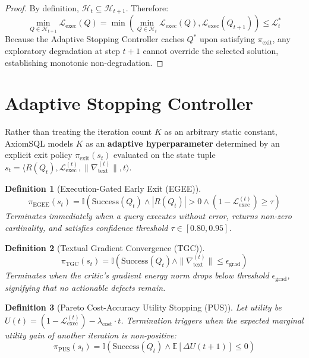 \documentclass[conference]{IEEEtran}
\newtheorem{definition}{Definition}
\begin{document}
\begin{proof}
By definition, $\mathcal{H}_{t} \subseteq \mathcal{H}_{t+1}$. Therefore:
\begin{equation}
    \min_{Q \in \mathcal{H}_{t+1}} \mathcal{L}_{\text{exec}}(Q) = \min\left( \min_{Q \in \mathcal{H}_t} \mathcal{L}_{\text{exec}}(Q), \mathcal{L}_{\text{exec}}(Q_{t+1}) \right) \le \mathcal{L}^*_t
\end{equation}
Because the Adaptive Stopping Controller caches $Q^*$ upon satisfying $\pi_{\text{exit}}$, any exploratory degradation at step $t+1$ cannot override the selected solution, establishing monotonic non-degradation.
\end{proof}

\section{Adaptive Stopping Controller}

Rather than treating the iteration count $K$ as an arbitrary static constant, AxiomSQL models $K$ as an \textbf{adaptive hyperparameter} determined by an explicit exit policy $\pi_{\text{exit}}(s_t)$ evaluated on the state tuple $s_t = \langle R(Q_t), \mathcal{L}_{\text{exec}}^{(t)}, \|\nabla_{\text{text}}^{(t)}\|, t \rangle$.

\begin{definition}[Execution-Gated Early Exit (EGEE)]
\begin{equation}
    \pi_{\text{EGEE}}(s_t) = \mathbb{I}\left( \text{Success}(Q_t) \land |R(Q_t)| > 0 \land (1 - \mathcal{L}_{\text{exec}}^{(t)}) \ge \tau \right)
\end{equation}
Terminates immediately when a query executes without error, returns non-zero cardinality, and satisfies confidence threshold $\tau \in [0.80, 0.95]$.
\end{definition}

\begin{definition}[Textual Gradient Convergence (TGC)]
\begin{equation}
    \pi_{\text{TGC}}(s_t) = \mathbb{I}\left( \text{Success}(Q_t) \land \|\nabla_{\text{text}}^{(t)}\| \le \epsilon_{\text{grad}} \right)
\end{equation}
Terminates when the critic's gradient energy norm drops below threshold $\epsilon_{\text{grad}}$, signifying that no actionable defects remain.
\end{definition}

\begin{definition}[Pareto Cost-Accuracy Utility Stopping (PUS)]
Let utility be $U(t) = (1 - \mathcal{L}_{\text{exec}}^{(t)}) - \lambda_{\text{cost}} \cdot t$. Termination triggers when the expected marginal utility gain of another iteration is non-positive:
\begin{equation}
    \pi_{\text{PUS}}(s_t) = \mathbb{I}\left( \text{Success}(Q_t) \land \mathbb{E}[\Delta U(t+1)] \le 0 \right)
\end{equation}
\end{definition}
\end{document}

